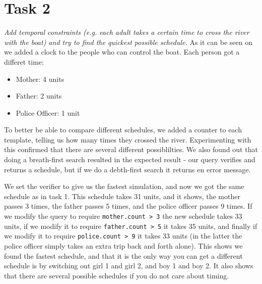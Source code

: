 \section{Task 2}
\label{sec:task2}
\textit{Add temporal constraints (e.g. each adult takes a certain time to cross the river with the boat) and try to find the quickest possible schedule.}
As it can be seen on  we added a clock to the people who can control the boat. Each person got a differet time:

\begin{itemize}
	\item Mother: 4 units
	\item Father: 2 units
	\item Police Officer: 1 unit
\end{itemize}

\noindent To better be able to compare different schedules, we added a counter to each template, telling us how many times they crossed the river. Experimenting with this confirmed that there are several different possiblilties. We also found out that doing a breath-first search resulted in the expected result - our query verifies and returns a schedule, but if we do a debth-first search it returns en error message.

\noindent We set the verifier to give us the fastest simulation, and now we got the same schedule as in task 1. This schedule takes 31 units, and it shows, the mother passes 3 times, the father passes 5 times, and the police officer passes 9 times. If we modify the query to require \texttt{mother.count > 3} the new schedule takes 33 units, if we modify it to require \texttt{father.count > 5} it takes 35 units, and finally if we modify it to require \texttt{police.count > 9} it takes 33 units (in the latter the police officer simply takes an extra trip back and forth alone). This shows we found the fastest schedule, and that it is the only way you can get a different schedule is by switching out girl 1 and girl 2, and boy 1 and boy 2. It also shows that there are several possible schedules if you do not care about timing.